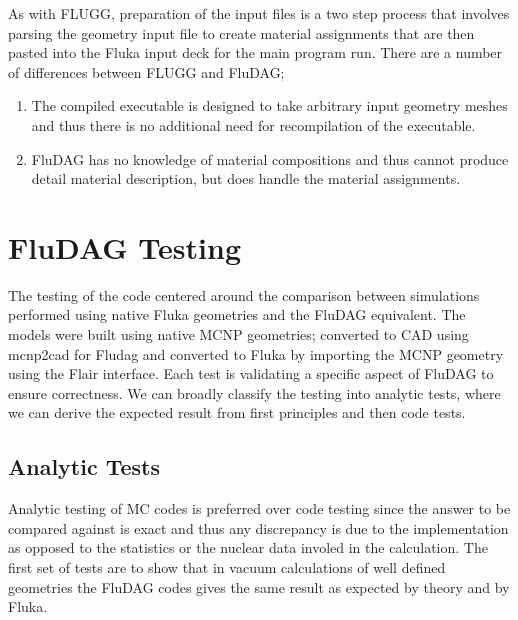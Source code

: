 \documentclass{anstrans}
\begin{document}
As with FLUGG, preparation of the input files is a two step process
that involves parsing the geometry input file to create material
assignments that are then pasted into the Fluka input deck for the main
program run.  There are a number of differences between FLUGG and FluDAG;
\begin{enumerate}
\item{The compiled executable is designed to take arbitrary input geometry meshes 
and thus there is no additional need for recompilation of the executable.}
\item{FluDAG has no knowledge of material compositions and thus cannot produce
detail material description, but does handle the material assignments.}
\end{enumerate}

\section{FluDAG Testing}
The testing of the code centered around the comparison between
simulations performed using native Fluka geometries and the FluDAG
equivalent. The models were built using native MCNP geometries;
converted to CAD using mcnp2cad for Fludag and converted to Fluka by
importing the MCNP geometry using the Flair\cite{flair} interface. Each test
is validating a specific aspect of FluDAG to ensure correctness. We
can broadly classify the testing into analytic tests, where we can
derive the expected result from first principles and then code tests.

\subsection{Analytic Tests}
Analytic testing of MC codes is preferred over code testing since the
answer to be compared against is exact and thus any discrepancy is due
to the implementation as opposed to the statistics or the nuclear data
involed in the calculation. The first set of tests are to show that in
vacuum calculations of well defined geometries the FluDAG codes gives
the same result as expected by theory and by Fluka.
\end{document}
